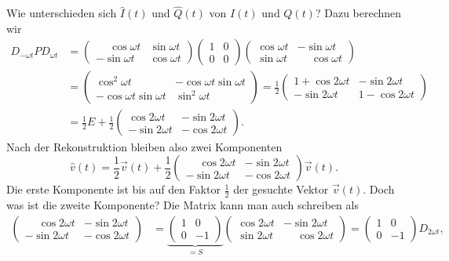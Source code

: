 Wie unterschieden sich $\hat{I}(t)$ und $\hat{Q}(t)$ von $I(t)$ und $Q(t)$?
Dazu berechnen wir
\begin{align*}
D_{-\omega t}PD_{\omega t}
&=
\begin{pmatrix}
\phantom{-}\cos\omega t & \sin\omega t \\
         - \sin\omega t & \cos\omega t
\end{pmatrix}
\begin{pmatrix} 1 & 0 \\ 0 & 0 \end{pmatrix}
\begin{pmatrix}
\cos\omega t &          - \sin\omega t \\
\sin\omega t & \phantom{-}\cos\omega t
\end{pmatrix}
\\
&=
\begin{pmatrix}
 \cos^2\omega t           & -\cos\omega t \sin\omega t \\
-\cos\omega t \sin\omega t&\sin^2\omega t
\end{pmatrix}
=
\frac12
\begin{pmatrix}
1+\cos 2\omega t &  -\sin 2\omega t \\
 -\sin 2\omega t & 1-\cos 2\omega t
\end{pmatrix}
\\
&=
\frac12 E + \frac12
\begin{pmatrix}
 \cos 2\omega t & -\sin 2\omega t \\
-\sin 2\omega t & -\cos 2\omega t
\end{pmatrix}.
\end{align*}
Nach der Rekonstruktion bleiben also zwei Komponenten
\[
\hat{v}(t)
=
\frac12\vec{v}(t)
+
\frac12
\begin{pmatrix}
\phantom{-}\cos 2\omega t & -\sin 2\omega t \\
         - \sin 2\omega t & -\cos 2\omega t
\end{pmatrix}\vec{v}(t).
\]
Die erste Komponente ist bis auf den Faktor $\frac12$ der gesuchte
Vektor $\vec{v}(t)$.
Doch was ist die zweite Komponente?
Die Matrix kann man auch schreiben als
\begin{align*}
\begin{pmatrix}
\phantom{-}\cos2\omega t&-\sin2\omega t\\
         - \sin2\omega t&-\cos2\omega t
\end{pmatrix}
&=
\underbrace{
\begin{pmatrix}
1& 0\\
0&-1
\end{pmatrix}}_{\displaystyle = S}
\begin{pmatrix}
\cos2\omega t &          - \sin2\omega t \\
\sin2\omega t & \phantom{-}\cos2\omega t
\end{pmatrix}
=
\begin{pmatrix}
1& 0\\
0&-1
\end{pmatrix}
D_{2\omega t},
\end{align*}
